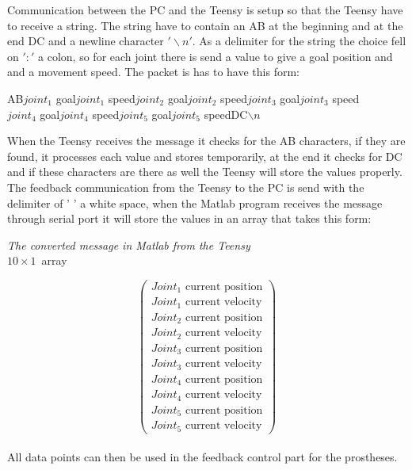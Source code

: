 Communication between the PC and the Teensy is setup so that the Teensy have to receive a string. The string have to contain an AB at the beginning and at the end DC and a newline character $'\backslash n'$. As a delimiter for the string the choice fell on $'\colon'$ a colon, so for each joint there is send a value to give a goal position and and a movement speed. The packet is has to have this form:\\
\begin{center}
     AB\colon$joint_1$ goal\colon$joint_1$ speed\colon$joint_2$ goal\colon$joint_2$ speed\colon$joint_3$ goal\colon$joint_3$ speed\\\colon$joint_4$ goal\colon$joint_4$ speed\colon$joint_5$ goal\colon$joint_5$ speed\colon DC\colon$\backslash n$   \\
    
\end{center}
   
When the Teensy receives the message it checks for the AB characters, if they are found, it processes each value and stores temporarily, at the end it checks for DC and if these characters are there as well the Teensy will store the values properly. \\
The feedback communication from the Teensy to the PC is send with the delimiter of ' ' a white space, when the Matlab program receives the message through serial port it will store the values in an array that takes this form:\\
 \begin{center}
     \emph{The converted message in Matlab from the Teensy}\\
     $10 \times 1$~array
 \end{center}

\[ \left( \begin{array}{c}
Joint_1 \mbox{ current position}   \\
Joint_1 \mbox{ current velocity}  \\
Joint_2 \mbox{ current position}   \\
Joint_2 \mbox{ current velocity}  \\
Joint_3 \mbox{ current position}   \\
Joint_3 \mbox{ current velocity}  \\
Joint_4 \mbox{ current position}   \\
Joint_4 \mbox{ current velocity}  \\
Joint_5 \mbox{ current position}   \\
Joint_5 \mbox{ current velocity}
\end{array} \right)\] \\

All data points can then be used in the feedback control part for the prostheses. 


